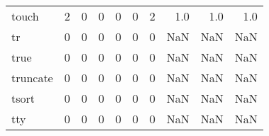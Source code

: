 \begin{tabular}{lrrrrrrrrr}
touch     &                                       2 &                                                  0 &                                                  0 &                                                  0 &                                                  0 &                                                  2 &                                                1.0 &                                    1.0 &                                  1.0 \\
tr        &                                       0 &                                                  0 &                                                  0 &                                                  0 &                                                  0 &                                                  0 &                                                NaN &                                    NaN &                                  NaN \\
true      &                                       0 &                                                  0 &                                                  0 &                                                  0 &                                                  0 &                                                  0 &                                                NaN &                                    NaN &                                  NaN \\
truncate  &                                       0 &                                                  0 &                                                  0 &                                                  0 &                                                  0 &                                                  0 &                                                NaN &                                    NaN &                                  NaN \\
tsort     &                                       0 &                                                  0 &                                                  0 &                                                  0 &                                                  0 &                                                  0 &                                                NaN &                                    NaN &                                  NaN \\
tty       &                                       0 &                                                  0 &                                                  0 &                                                  0 &                                                  0 &                                                  0 &                                                NaN &                                    NaN &                                  NaN \\

\end{tabular}
